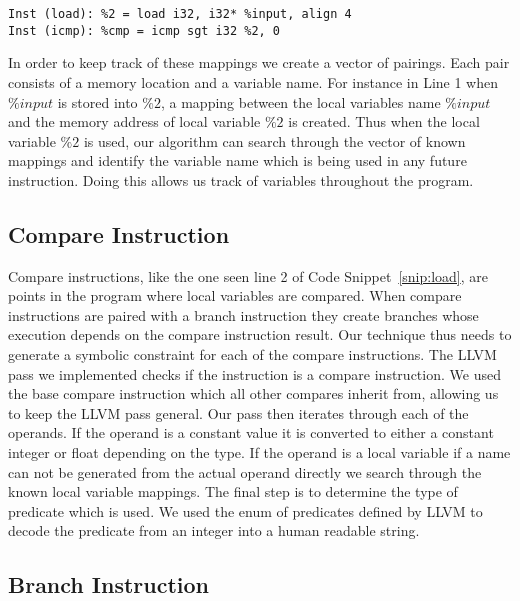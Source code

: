 \vspace{-0.6cm}

\begin{lstlisting}[escapechar=@, caption={Load Instruction}, label=snip:load]
Inst (load): %2 = load i32, i32* %input, align 4
Inst (icmp): %cmp = icmp sgt i32 %2, 0
\end{lstlisting}

In order to keep track of these mappings we create a vector of pairings. Each pair consists of a memory location and a variable name. For instance in Line 1 when $\%input$ is stored into $\%2$, a mapping between the local variables name $\%input$ and the memory address of local variable $\%2$ is created. Thus when the local variable $\%2$ is used, our algorithm can search through the vector of known mappings and identify the variable name which is being used in any future instruction. Doing this allows us track of variables throughout the program.

\subsection{Compare Instruction}

Compare instructions, like the one seen line 2 of Code Snippet~\ref{snip:load}, are points in the program where local variables are compared. When compare instructions are paired with a branch instruction they create branches whose execution depends on the compare instruction result. Our technique thus needs to generate a symbolic constraint for each of the compare instructions. The LLVM pass we implemented checks if the instruction is a compare instruction\cite{compareinstruction}. We used the base compare instruction which all other compares inherit from, allowing us to keep the LLVM pass general. Our pass then iterates through each of the operands. If the operand is a constant value it is converted to either a constant integer or float depending on the type. If the operand is a local variable if a name can not be generated from the actual operand directly we search through the known local variable mappings. The final step is to determine the type of predicate which is used. We used the enum of predicates defined by LLVM to decode the predicate from an integer into a human readable string.

\subsection{Branch Instruction}

